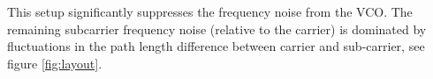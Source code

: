 This setup significantly suppresses the frequency noise from the VCO. The remaining subcarrier frequency noise (relative to the carrier) is dominated by fluctuations in the path length difference between carrier and sub-carrier, see figure \ref{fig:layout}.








